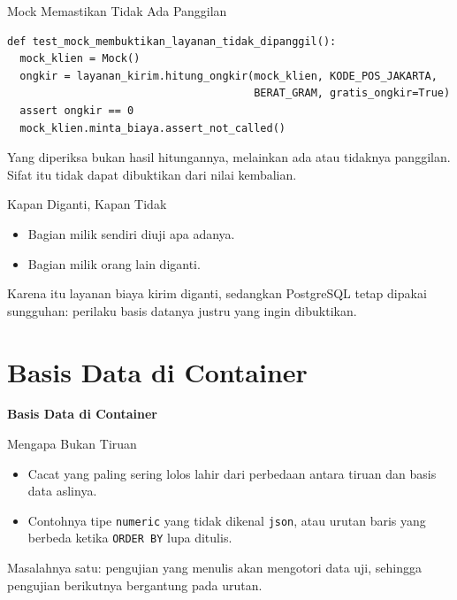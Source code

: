 \documentclass[aspectratio=169, table, 12pt]{beamer}
\begin{document}
\begin{frame}[fragile]{{\Large Mock Memastikan Tidak Ada Panggilan}}
  \vspace{2pt}
\begin{lstlisting}[style=PythonStyle]
def test_mock_membuktikan_layanan_tidak_dipanggil():
  mock_klien = Mock()
  ongkir = layanan_kirim.hitung_ongkir(mock_klien, KODE_POS_JAKARTA,
                                       BERAT_GRAM, gratis_ongkir=True)
  assert ongkir == 0
  mock_klien.minta_biaya.assert_not_called()
\end{lstlisting}
  \vspace{4pt}
  {\small Yang diperiksa bukan hasil hitungannya, melainkan ada atau tidaknya
  panggilan. Sifat itu tidak dapat dibuktikan dari nilai kembalian.}
\end{frame}

\begin{frame}{{\Large Kapan Diganti, Kapan Tidak}}
  \vspace{14pt}
  \begin{itemize}
    \item Bagian milik sendiri diuji apa adanya.
    \item Bagian milik orang lain diganti.
  \end{itemize}
  \vspace{10pt}
  {\small Karena itu layanan biaya kirim diganti, sedangkan PostgreSQL tetap
  dipakai sungguhan: perilaku basis datanya justru yang ingin dibuktikan.}
\end{frame}

\section{Basis Data di Container}

\begin{frame}{\hfill}
  \centering
  \Huge{\textbf{Basis Data di Container}}
\end{frame}

\begin{frame}{{\Large Mengapa Bukan Tiruan}}
  \vspace{12pt}
  \begin{itemize}
    \item Cacat yang paling sering lolos lahir dari perbedaan antara tiruan
          dan basis data aslinya.
    \item Contohnya tipe \texttt{numeric} yang tidak dikenal \texttt{json},
          atau urutan baris yang berbeda ketika \texttt{ORDER BY} lupa
          ditulis.
  \end{itemize}
  \vspace{10pt}
  {\small Masalahnya satu: pengujian yang menulis akan mengotori data uji,
  sehingga pengujian berikutnya bergantung pada urutan.}
\end{frame}
\end{document}

